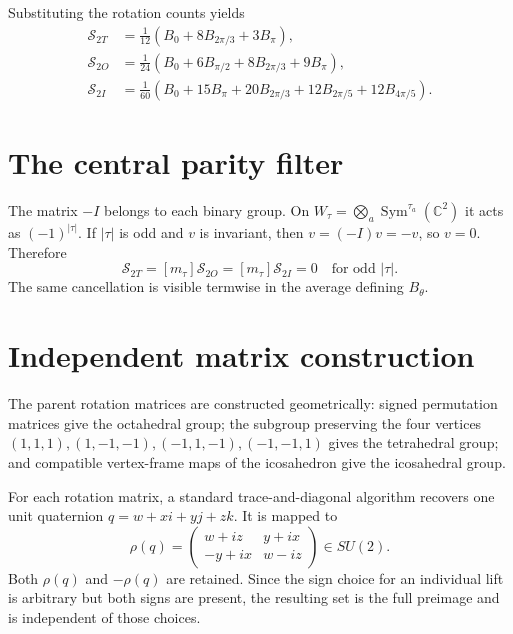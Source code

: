 \documentclass[11pt]{article}
\newcommand{\Sfun}{\mathcal S}
\newcommand{\Sym}{\operatorname{Sym}}
\begin{document}
Substituting the rotation counts yields
\begin{align}
\Sfun_{2T}&=\frac1{12}(B_0+8B_{2\pi/3}+3B_\pi),            \tag{4}\\
\Sfun_{2O}&=\frac1{24}(B_0+6B_{\pi/2}+8B_{2\pi/3}+9B_\pi),\tag{5}\\
\Sfun_{2I}&=\frac1{60}(B_0+15B_\pi+20B_{2\pi/3}
+12B_{2\pi/5}+12B_{4\pi/5}).                              \tag{6}
\end{align}

\section{The central parity filter}

The matrix $-I$ belongs to each binary group.  On
$W_\tau=\bigotimes_a\Sym^{\tau_a}(\mathbb C^2)$ it acts as
$(-1)^{|\tau|}$.  If $|\tau|$ is odd and $v$ is invariant, then
$v=(-I)v=-v$, so $v=0$.  Therefore
\begin{equation}
[m_\tau]\Sfun_{2T}=[m_\tau]\Sfun_{2O}=[m_\tau]\Sfun_{2I}=0
\quad\text{for odd }|\tau|.                                \tag{7}
\end{equation}
The same cancellation is visible termwise in the average defining
$B_\theta$.

\section{Independent matrix construction}

The parent rotation matrices are constructed geometrically: signed
permutation matrices give the octahedral group; the subgroup preserving the
four vertices $(1,1,1),(1,-1,-1),(-1,1,-1),(-1,-1,1)$ gives the tetrahedral
group; and compatible vertex-frame maps of the icosahedron give the
icosahedral group.

For each rotation matrix, a standard trace-and-diagonal algorithm recovers one
unit quaternion $q=w+xi+yj+zk$.  It is mapped to
\begin{equation}
\rho(q)=\begin{pmatrix}
w+iz&y+ix\\-y+ix&w-iz
\end{pmatrix}\in SU(2).                                    \tag{8}
\end{equation}
Both $\rho(q)$ and $-\rho(q)$ are retained.  Since the sign choice for an
individual lift is arbitrary but both signs are present, the resulting set is
the full preimage and is independent of those choices.
\end{document}
